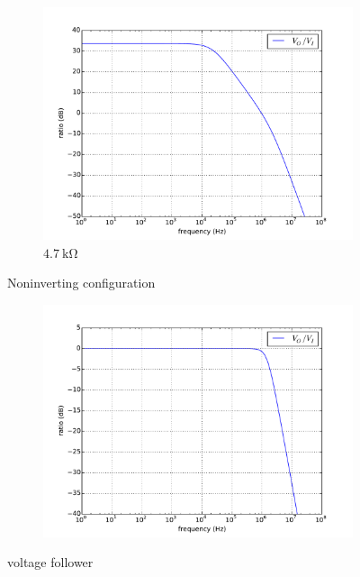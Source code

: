 \documentclass[12pt, a4paper]{article}
\begin{document}
\begin{enumerate}[itemsep=20pt, topsep=10pt]
\begin{figure}[H]
\begin{subfigure}[b]{0.45\textwidth}
      \includegraphics[width=1\textwidth]{circuit/p4.pdf}
      \caption{$\SI{4.7}\kohm$}
    \end{subfigure}
    \caption{Noninverting configuration}
  \end{figure}
  \begin{figure}[H]
    \centering
    \begin{subfigure}[b]{0.45\textwidth}
      \includegraphics[width=1\textwidth]{circuit/p5.pdf}
    \end{subfigure}
    \caption{voltage follower}
  \end{figure}

\end{enumerate}
\end{document}
